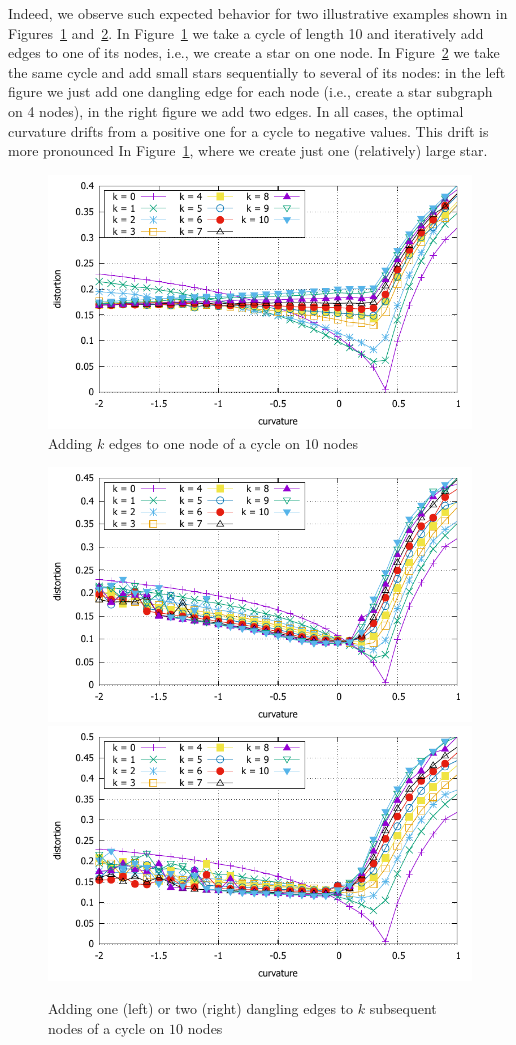 \documentclass{article} %
\begin{document}
Indeed, we observe such expected behavior for two illustrative examples shown in Figures~\ref{fig:star} and~\ref{fig:stars}. In Figure~\ref{fig:star} we take a cycle of length 10 and iteratively add edges to one of its nodes, i.e., we create a star on one node. In Figure~\ref{fig:stars} we take the same cycle and add small stars sequentially to several of its nodes: in the left figure we just add one dangling edge for each node (i.e., create a star subgraph on 4 nodes), in the right figure  we add two edges. In all cases, the optimal curvature drifts from a positive one for a cycle to negative values. This drift is more pronounced In Figure~\ref{fig:star}, where we create just one (relatively) large star.

\begin{figure}
    \centering
    \includegraphics[width = 0.49 \textwidth]{illustration_star.pdf}
    \caption{Adding $k$ edges to one node of a cycle on $10$ nodes}\label{fig:star}
\end{figure}

\begin{figure}
    \centering
    \includegraphics[width = 0.49 \textwidth]{illustration_stars_1.pdf}
    \includegraphics[width = 0.49 \textwidth]{illustration_stars_2.pdf}
    \caption{Adding one (left) or two (right) dangling edges to $k$ subsequent nodes of a cycle on $10$ nodes}\label{fig:stars}
\end{figure}
\end{document}
